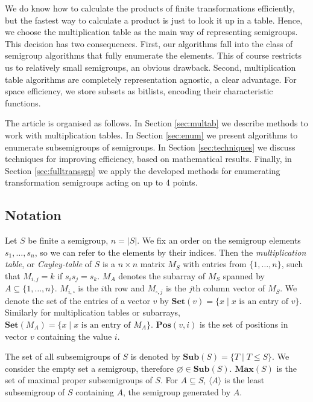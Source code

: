 \documentclass{amsart}
\newcommand{\Sub}{\mathbf{Sub}}
\newcommand{\Set}{\mathbf{Set}}
\newcommand{\Pos}{\mathbf{Pos}}
\newcommand{\Max}{\mathbf{Max}}
\theoremstyle{plain}
\theoremstyle{definition}
\begin{document}
We do know how to calculate the products of finite transformations efficiently, but the fastest way to calculate a product is just to look it up in a table.
Hence, we choose the multiplication table as the main way of representing semigroups.
This decision has two consequences. 
First, our algorithms fall into the class of semigroup algorithms that fully enumerate the elements.
This of course  restricts us to relatively small semigroups, an obvious drawback.
Second, multiplication table algorithms are completely representation agnostic, a clear advantage.
For space efficiency, we store subsets as bitlists, encoding their characteristic functions.

The article is organised as follows.
In Section \ref{sec:multab} we describe methods to work with multiplication tables.
In Section \ref{sec:enum} we present algorithms to enumerate subsemigroups of semigroups.
In Section \ref{sec:techniques} we discuss techniques for improving efficiency, based on mathematical results.
Finally, in Section \ref{sec:fulltranssgp} we apply the developed methods for enumerating transformation semigroups acting on up to 4 points.

\subsection{Notation}

Let $S$ be finite a semigroup, $n=|S|$.
We fix an order on the semigroup elements $s_1,\ldots, s_n$, so we can refer to the elements by their indices. 
Then the  \emph{multiplication table}, or \emph{Cayley-table} of $S$ is a $n\times n$ matrix $M_S$ with entries from $\{1,\ldots,n\}$, such that $M_{i,j}=k$ if $s_is_j=s_k$.
$M_A$ denotes the subarray of $M_S$ spanned by $A\subseteq\{1,\ldots,n\}$.
$M_{i,\square}$ is the $i$th row and $M_{\square,j}$ is the $j$th column vector of $M_S$.
We denote the set of the entries of a vector $v$ by $\Set(v)=\{x\mid x\text{ is an entry of } v\}$.
Similarly for multiplication tables or subarrays, $\Set(M_A)=\{x\mid x\text{ is an entry of } M_A\}$.
$\Pos(v,i)$ is the set of positions in vector $v$ containing the value $i$.

The set of all subsemigroups of $S$ is denoted by $\Sub(S)=\big\{T\mid T\leq S \big\}$.
We consider the empty set a semigroup, therefore $\varnothing\in\Sub(S)$.
$\Max(S)$ is the set of maximal proper subsemigroups of $S$.
For $A\subseteq S$, $\langle A\rangle$ is the least subsemigroup of $S$ containing $A$, the semigroup generated by $A$. 
\end{document}

